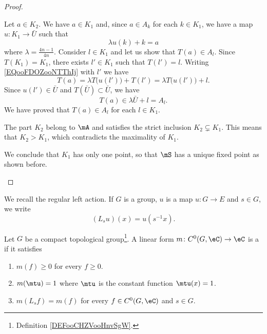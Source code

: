 \begin{proof}
\begin{subproof}
\begin{subproof}
        Let \( a\in K_2\). We have \( a\in K_1\) and, since \( a\in A_k\) for each \( k\in K_1\), we have a map \( u\colon K_1\to \bar U\) such that
        \begin{equation}        \label{EQooFDOZooNTThIj}
            \lambda u(k)+k=a
        \end{equation}
        where \( \lambda=\frac{ 4n-1 }{ 4n }\). 
        Consider \( l\in K_1\) and let us show that \( T(a)\in A_{l}\). Since \( T(K_1)=K_1\), there exists \( l'\in K_1\) such that \( T(l')=l\). Writing \eqref{EQooFDOZooNTThIj} with \( l'\) we have
        \begin{equation}
            T(a)=\lambda T\big( u(l') \big)+T(l')=\lambda T\big( u(l') \big)+l.
        \end{equation}
        Since \( u(l')\in \bar U\) and \( T(\bar U)\subset \bar U\), we have
        \begin{equation}
            T(a)\in \lambda\bar U+l=A_l.
        \end{equation}
        We have proved that \( T(a)\in A_l\) for each \( l\in K_1\).
        \end{subproof}
    \spitem[Conclusion]
        The part \( K_2\) belong to \( \mA\) and satisfies the strict inclusion \( K_2\subsetneq K_1\). This means that \( K_2>K_1\), which contradicts the maximality of \( K_1\).

        We conclude that \( K_1\) has only one point, so that \( \mS\) has a unique fixed point as shown before.
    \end{subproof}
\end{proof}

We recall the regular left action. If \( G\) is a group, \( u\) is a map \( u\colon G\to E\) and \( s\in G\), we write
\begin{equation}
    (L_su)(x)=u(s^{-1}x).
\end{equation}

\begin{definition}        \label{DEFooSBRZooUbzMnN}
    Let \( G\) be a compact topological group\footnote{Definition \ref{DEFooCHZVooHnvSgW}.}. A linear form \( m\colon C^0(G,\eC)\to \eC\) is a  if it satisfies
    \begin{enumerate}
        \item
            \( m(f)\geq 0\) for every \( f\geq 0\).
        \item
            \( m(\mtu)=1\) where \( \mtu\) is the constant function \( \mtu(x)=1\).
        \item
            \( m(L_sf)=m(f)\) for every \( f\in C^0(G,\eC)\) and \( s\in G\).
    \end{enumerate}
\end{definition}

